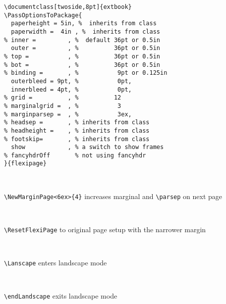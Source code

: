 \documentclass[twoside,8pt]{extarticle}
\begin{document}
\begin{verbatim}
\documentclass[twoside,8pt]{extbook}
\PassOptionsToPackage{
  paperheight = 5in, %  inherits from class
  paperwidth =  4in , %  inherits from class
% inner =         , %  default 36pt or 0.5in
  outer =         , %          36pt or 0.5in
% top =           , %          36pt or 0.5in
% bot =           , %          36pt or 0.5in
% binding =       , %           9pt or 0.125in
  outerbleed = 9pt, %           0pt,
  innerbleed = 4pt, %           0pt,
% grid =          , %          12
% marginalgrid =  , %           3
% marginparsep =  , %           3ex,
% headsep =       , % inherits from class
% headheight =    , % inherits from class
% footskip=       , % inherits from class
  show            , % a switch to show frames
% fancyhdrOff       % not using fancyhdr
}{flexipage}
\end{verbatim}
\footnotesize

         \lipsum[10][1-3] \marginpar[{\itshape\tiny\lipsum[1][1-4]}]{\itshape\tiny\lipsum[8]}

         \lipsum[2] \marginpar[{\itshape\tiny\lipsum[1][1-4]}]{\itshape\tiny\lipsum[8][1-5]}

         \lipsum[2][1-6]

~

{\normalsize
\noindent\verb"\NewMarginPage<6ex>{4}" increases marginal and \verb"\parsep" on next page}

         \lipsum[3][1-3]  \marginpar[{\itshape\tiny\lipsum[1][1-4]}]{\itshape\tiny\lipsum[10][1-4]}

         \lipsum[1][1-8]

       \lipsum[2][1-7]

~

{\normalsize
\noindent\verb"\ResetFlexiPage" to original page setup with the narrower margin}
\ResetFlexiPage

         \lipsum[10][1-5] \marginpar[{\itshape\tiny\lipsum[1][1-4]}]{\itshape\tiny\lipsum[1][1-3]} \lipsum[2]

~

{\normalsize
\noindent\verb"\Lanscape" enters landscape mode}
\begin{Landscape} %

         \lipsum[1-4]

~

{\normalsize
\noindent\verb"\endLandscape" exits landscape mode }
\end{Landscape} %
         \lipsum[2][1-5] \marginpar[{\itshape\tiny\lipsum[1][1-4]}]{\itshape\tiny\lipsum[1][1-3]} \lipsum[11]
\end{document}
